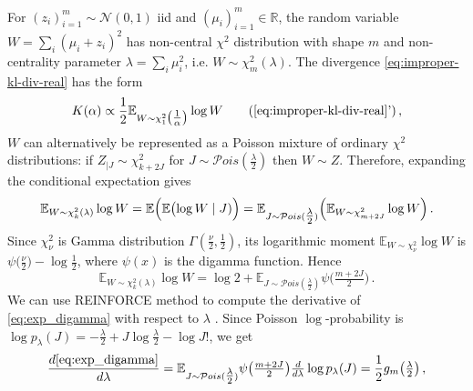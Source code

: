 \documentclass[a4paper,10pt,twocolumn]{article}
\begin{document}
For $(z_i)_{i=1}^m \sim \mathcal{N}(0, 1)$ iid and $
  (\mu_i)_{i=1}^m \in \mathbb{R}
$, the random variable $W = \sum_i (\mu_i + z_i)^2$ has non-central $\chi^2$ distribution
with shape $m$ and non-centrality parameter $\lambda = \sum_i \mu_i^2$, i.e. $
  W\sim \chi^2_m(\lambda)
$. The divergence \eqref{eq:improper-kl-div-real} has the form
\begin{equation}  \label{eq:kl-div-appendix}
  K(\alpha)
    \propto \frac12 \mathbb{E}_{
        W\sim \chi^2_1\bigl(\tfrac1{\alpha}\bigr)
      } \log W
    \tag{\ref{eq:improper-kl-div-real}'}
  \,,
\end{equation}
$W$ can alternatively be represented as a Poisson mixture of ordinary $\chi^2$
distributions: if $Z_{\mid J} \sim \chi^2_{k + 2J}$ for $
  J \sim \mathcal{P}ois(\tfrac{\lambda}2)
$ then $W \sim Z$. Therefore, expanding the conditional expectation gives
\begin{equation}  \label{eq:cond_exp_expansion}
  \mathbb{E}_{W\sim \chi^2_k(\lambda)} \log W
    = \mathbb{E}\Bigl(
        \mathbb{E} \bigl( \log W \mid J)
      \Bigr)
    = \mathbb{E}_{J\sim {\mathcal{P}ois}(\tfrac\lambda2)}
      \Bigl(
        \mathbb{E}_{W\sim \chi^2_{m + 2 J}} \log W
      \Bigr)
    \,.
\end{equation}
Since $\chi^2_\nu$ is Gamma distribution $\Gamma(\tfrac\nu2, \tfrac12)$, its logarithmic
moment $
  \mathbb{E}_{W\sim \chi^2_\nu} \log W
$ is $
  \psi\bigl(\tfrac\nu{2}\bigr) - \log \tfrac12
$, where $\psi(x)$ is the digamma function. Hence
\begin{equation}  \label{eq:exp_digamma}
  \mathbb{E}_{W\sim \chi^2_k(\lambda)} \log W
    = \log2 + \mathbb{E}_{J\sim {\mathcal{P}ois}(\tfrac\lambda2)}
      \psi\bigl(\tfrac{m + 2 J}{2}\bigr)
    \,.
\end{equation}
We can use REINFORCE method to compute the derivative of \eqref{eq:exp_digamma} with respect
to $\lambda$ \citep{williams_simple_1992}. Since Poisson $\log$-probability is $
  \log p_\lambda(J)
    = - \tfrac{\lambda}2
      + J \log \tfrac{\lambda}2
      - \log J!
$, we get
\begin{equation}  \label{eq:exp_reinforce}
  \frac{d \eqref{eq:exp_digamma}}{d \lambda}
    =
    \mathbb{E}_{J\sim {\mathcal{P}ois}(\tfrac\lambda2)}
      \psi\bigl(\tfrac{m + 2 J}{2}\bigr)
      \tfrac{d}{d \lambda} \log p_\lambda(J)
    = \frac12 g_m\bigl(\tfrac\lambda2\bigr)
    \,,
\end{equation}
\end{document}
